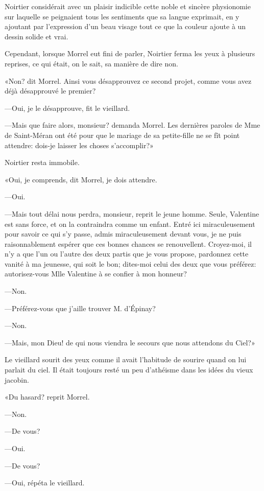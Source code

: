 Noirtier considérait avec un plaisir indicible cette noble et sincère physionomie sur laquelle se peignaient tous les sentiments que sa langue exprimait, en y ajoutant par l'expression d'un beau visage tout ce que la couleur ajoute à un dessin solide et vrai. 

Cependant, lorsque Morrel eut fini de parler, Noirtier ferma les yeux à plusieurs reprises, ce qui était, on le sait, sa manière de dire non. 

«Non? dit Morrel. Ainsi vous désapprouvez ce second projet, comme vous avez déjà désapprouvé le premier? 

—Oui, je le désapprouve, fit le vieillard. 

—Mais que faire alors, monsieur? demanda Morrel. Les dernières paroles de Mme de Saint-Méran ont été pour que le mariage de sa petite-fille ne se fît point attendre: dois-je laisser les choses s'accomplir?» 

Noirtier resta immobile. 

«Oui, je comprends, dit Morrel, je dois attendre. 

—Oui. 

—Mais tout délai nous perdra, monsieur, reprit le jeune homme. Seule, Valentine est sans force, et on la contraindra comme un enfant. Entré ici miraculeusement pour savoir ce qui s'y passe, admis miraculeusement devant vous, je ne puis raisonnablement espérer que ces bonnes chances se renouvellent. Croyez-moi, il n'y a que l'un ou l'autre des deux partis que je vous propose, pardonnez cette vanité à ma jeunesse, qui soit le bon; dites-moi celui des deux que vous préférez: autorisez-vous Mlle Valentine à se confier à mon honneur? 

—Non. 

—Préférez-vous que j'aille trouver M. d'Épinay? 

—Non. 

—Mais, mon Dieu! de qui nous viendra le secours que nous attendons du Ciel?» 

Le vieillard sourit des yeux comme il avait l'habitude de sourire quand on lui parlait du ciel. Il était toujours resté un peu d'athéisme dans les idées du vieux jacobin. 

«Du hasard? reprit Morrel. 

—Non. 

—De vous? 

—Oui. 

—De vous? 

—Oui, répéta le vieillard. 


